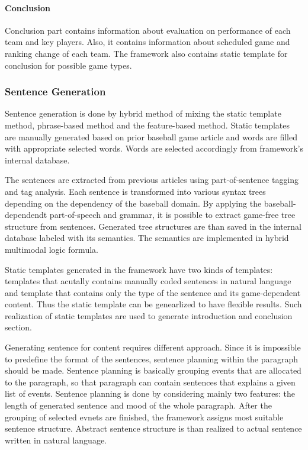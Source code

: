 \documentclass{sig-alternate}
\begin{document}
\paragraph{Conclusion} 

Conclusion part contains information about evaluation on performance of each team and key players. Also, it contains information about scheduled game and ranking change of each team. The framework also contains static template for conclusion for possible game types. 

\subsubsection{Sentence Generation} 

Sentence generation is done by hybrid method of mixing the static template method, phrase-based method and the feature-based method. Static templates are manually generated based on prior baseball game article and words are filled with appropriate selected words. Words are selected accordingly from framework's internal database. 

The sentences are extracted from previous articles using part-of-sentence tagging and tag analysis. Each sentence is transformed into various syntax trees depending on the dependency of the baseball domain. By applying the baseball-dependendt part-of-speech and grammar, it is possible to extract game-free tree structure from sentences. Generated tree structures are than saved in the internal database labeled with its semantics. The semantics are implemented in hybrid multimodal logic formula. 

Static templates generated in the framework have two kinds of templates: templates that acutally contains manually coded sentences in natural language and template that contains only the type of the sentence and its game-dependent content. Thus the static template can be genearlized to have flexible results. Such realization of static templates are used to generate introduction and conclusion section. 

Generating sentence for content requires different approach. Since it is impossible to predefine the format of the sentences, sentence planning within the paragraph should be made. Sentence planning is basically grouping events that are allocated to the paragraph, so that paragraph can contain sentences that explains a given list of events. Sentence planning is done by considering mainly two features: the length of generated sentence and mood of the whole paragraph. After the grouping of selected evnets are finished, the framework assigns most suitable sentence structure. Abstract sentence structure is than realized to actual sentence written in natural language. 
\end{document}
